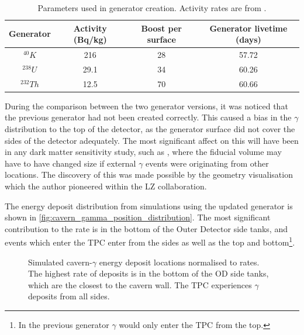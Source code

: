 \begin{table}
    \centering
    \begin{tabular}{c|c|c|c}
        Generator    & Activity (Bq/kg) & Boost per surface & Generator livetime (days)  \\ \hline
        ${}^{40}K$   & 216              & 28                & 57.72                      \\
        ${}^{238}U$  & 29.1             & 34                & 60.26                      \\
        ${}^{232}Th$ & 12.5             & 70                & 60.66
    \end{tabular}
    \caption{Parameters used in generator creation. Activity rates are from \cite{LZ_Gamma_Ray_Background_ref}.}
    \label{tab:cavern_gamma_generator_parameters}
\end{table}





\par
During the comparison between the two generator versions, it was noticed that the previous generator had not been created correctly.
This caused a bias in the $\gamma$ distribution to the top of the detector, as the generator surface did not cover the sides of the detector adequately.
The most significant affect on this will have been in any dark matter sensitivity study, such as \cite{lz_simulations_ref}, where the fiducial volume may have to have changed size if external $\gamma$ events were originating from other locations.
The discovery of this was made possible by the geometry visualisation which the author pioneered within the LZ collaboration.

\par
The energy deposit distribution from simulations using the updated generator is shown in \autoref{fig:cavern_gamma_position_distribution}.
The most significant contribution to the rate is in the bottom of the Outer Detector side tanks, and events which enter the TPC enter from the sides as well as the top and bottom\footnote{In the previous generator $\gamma$ would only enter the TPC from the top.}.

\begin{figure}
    \centering
    \resizebox{\textwidth}{!}{

}
    \caption[Simulated cavern-$\gamma$ energy deposit locations normalised to rates.]{Simulated cavern-$\gamma$ energy deposit locations normalised to rates.
             The highest rate of deposits is in the bottom of the OD side tanks, which are the closest to the cavern wall.
             The TPC experiences $\gamma$ deposits from all sides.}
    \label{fig:cavern_gamma_position_distribution}
\end{figure}